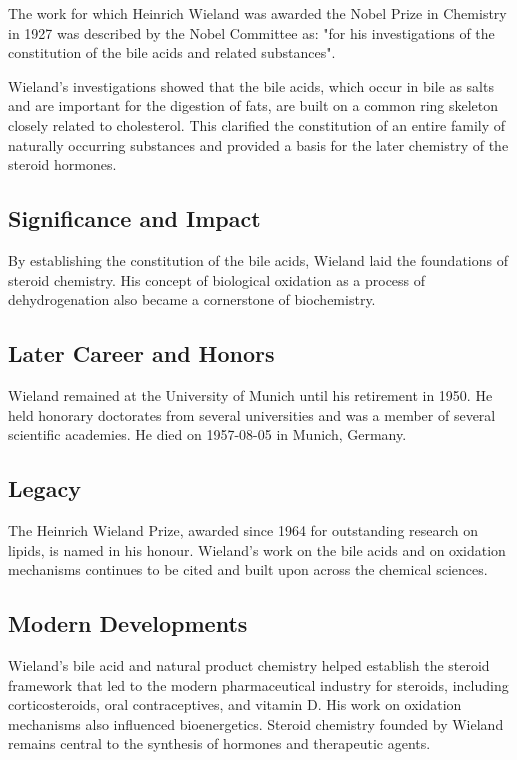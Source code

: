 The work for which Heinrich Wieland was awarded the Nobel Prize in Chemistry in 1927 was described by the Nobel Committee as: "for his investigations of the constitution of the bile acids and related substances".

Wieland's investigations showed that the bile acids, which occur in bile as salts and are important for the digestion of fats, are built on a common ring skeleton closely related to cholesterol.
This clarified the constitution of an entire family of naturally occurring substances and provided a basis for the later chemistry of the steroid hormones.

\subsection*{Significance and Impact}

By establishing the constitution of the bile acids, Wieland laid the foundations of steroid chemistry.
His concept of biological oxidation as a process of dehydrogenation also became a cornerstone of biochemistry.

\subsection*{Later Career and Honors}

Wieland remained at the University of Munich until his retirement in 1950.
He held honorary doctorates from several universities and was a member of several scientific academies.
He died on 1957-08-05 in Munich, Germany.

\subsection*{Legacy}

The Heinrich Wieland Prize, awarded since 1964 for outstanding research on lipids, is named in his honour.
Wieland's work on the bile acids and on oxidation mechanisms continues to be cited and built upon across the chemical sciences.

\subsection*{Modern Developments}

Wieland's bile acid and natural product chemistry helped establish the steroid framework that led to the modern pharmaceutical industry for steroids, including corticosteroids, oral contraceptives, and vitamin D. His work on oxidation mechanisms also influenced bioenergetics. Steroid chemistry founded by Wieland remains central to the synthesis of hormones and therapeutic agents.

